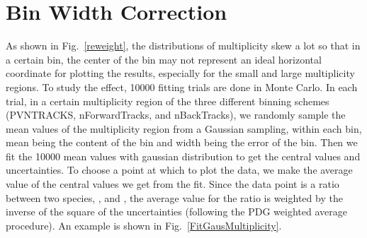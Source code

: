 \section{Bin Width Correction}\label{sec:binCorr}
As shown in Fig.~\ref{reweight}, the distributions of multiplicity skew a lot so that in a certain bin, the center of the bin may not 
represent an ideal horizontal coordinate for plotting the results, especially for the small and large multiplicity regions. 
To study the effect, 10000 fitting trials are done in Monte Carlo. In each trial, in a certain multiplicity region of the three different binning schemes (PVNTRACKS, nForwardTracks, and nBackTracks), 
we randomly sample the mean values of the multiplicity region from a Gaussian sampling, within each bin, mean being the content of the bin and width being the error of the bin. 
Then we fit the 10000 mean values with gaussian distribution to get the central values and uncertainties. To choose a point at which to plot the data, we make the average value of 
the central values we get from the fit. Since the data point is a ratio between two species, \jpsi, and \psitwos, the average value for the ratio is weighted by the inverse of the square of the 
uncertainties (following the PDG weighted average procedure). An example is shown in Fig.~\ref{FitGausMultiplicity}.
